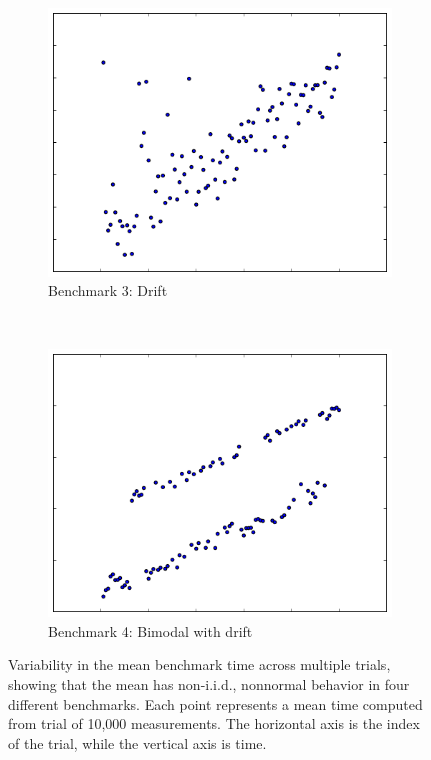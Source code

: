 \documentclass[conference]{IEEEtran}
\begin{document}
\begin{figure}
\begin{subfigure}{0.22\textwidth}
    \centering
    \includegraphics[width=\textwidth]{figures/fig1/drift_manyallocs_slow}
    \caption{Benchmark 3: Drift}
\end{subfigure}
~
\begin{subfigure}{0.22\textwidth}
    \centering
    \includegraphics[width=\textwidth]{figures/fig1/bimodal_drift_sumindex}
    \caption{Benchmark 4: Bimodal with drift}
\end{subfigure}
\caption{Variability in the mean benchmark time across multiple trials, showing
that the mean has non-i.i.d., nonnormal behavior in four different benchmarks.
Each point represents a mean time computed from trial of 10,000 measurements.
The horizontal axis is the index of the trial, while the vertical axis is time.}
\label{fig:meandistributions}
\end{figure}
\end{document}
